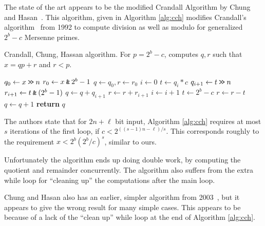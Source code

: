The state of the art appears to be the modified Crandall Algorithm by Chung and Hasan~\cite{chung2006low}.
This algorithm, given in Algorithm \ref{alg:cch} modifies Crandall's algorithm~\cite{crandall1992method} from 1992 to compute division as well as modulo for generalized $2^b-c$ Mersenne primes.
\begin{algorithm}[H]
   \caption{Crandall, Chung, Hassan algorithm. For $p=2^b-c$, computes $q, r$ such that $x = qp+r$ and $r<p$.}
   \label{alg:cch}
   \begin{algorithmic}
         \State $q_0 \gets x \mathbin{\texttt{>\!>}} n $
         \State $r_0 \gets x \mathbin{\texttt{\&}} 2^b-1$
         \State $q \gets q_0, r\gets r_0$
         \State $i \gets 0$
            \State $t \gets q_i*c$
            \State $q_{i+1} \gets t \mathbin{\texttt{>\!>}} n$
            \State $r_{i+1} \gets t \mathbin{\texttt{\&}} (2^b - 1)$
            \State $q\gets q+q_{i+1}$
            \State $r\gets r+r_{i+1}$
            \State $i\gets i+1$
         \EndWhile
         \State $t \gets 2^b-c$
            \State $r\gets r-t$
            \State $q\gets q+1$
         \EndWhile
         \State\textbf{return} $q$
   \end{algorithmic}
\end{algorithm}
The authors state that for $2n+\ell$ bit input, Algorithm \ref{alg:cch}
requires at most $s$ iterations of the first loop, if $c < 2^{((s-1)n-\ell)/s}$.
This corresponds roughly to the requirement $x < 2^b (2^b/c)^s$, similar to ours.

Unfortunately the algorithm ends up doing double work, by computing the quotient and remainder concurrently.
The algorithm also suffers from the extra while loop for ``cleaning up'' the computations after the main loop.



Chung and Hasan also has an earlier, simpler algorithm from 2003~\cite{chung2003more},
but it appears to give the wrong result for many simple cases.
This appears to be because of a lack of the ``clean up'' while loop at the end of Algorithm \ref{alg:cch}.




